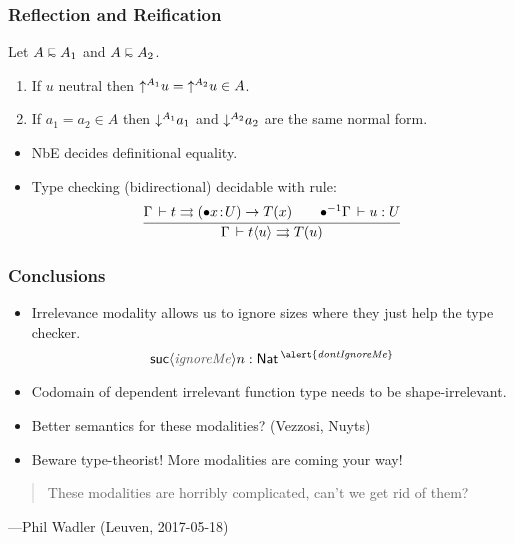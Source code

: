 \documentclass[t]{beamer}
\newcommand{\cAnn}{\color{red!80!black}}%
\renewcommand{\emph}[1]{{\cAnn#1}}
\newcommand{\irr}{\mathord{\bullet}}
\renewcommand{\erhyp}[3][\irr]{#1#2 \of #3}
\renewcommand{\erfunT}[4][\irr]{(\erhyp[#1]{#2}{#3}) \to #4}
\renewcommand{\resurrect}[1]{\irr^{-1}#1}
\begin{document}
\begin{frame}%
  \frametitle{Reflection and Reification}
  \begin{theorem}
    Let $A \shape A_1$ and $A \shape A_2$.
    \begin{enumerate}
    \item If $u$ neutral then $\mathord{\uparrow^{A_1}} u = \mathord{\uparrow^{A_2}} u \in A$.
    \item If $a_1 = a_2 \in A$ then $\mathord{\downarrow^{A_1}} a_1$ and $\mathord{\downarrow^{A_2}} a_2$ are the same normal form.
    \end{enumerate}
  \end{theorem}
  \begin{itemize}
  \item NbE decides definitional equality.
  \item Type checking (bidirectional) decidable with rule:
\[
  \ru{\Gamma \der t \jinf \erfunT x U T(x) \qquad
      \resurrect \Gamma \der u : U
    }{\Gamma \der t \ann u \jinf T(u)}
\]
  \end{itemize}
\end{frame}


\begin{frame}%
  \frametitle{Conclusions}
  \begin{itemize}
  \item Irrelevance modality allows us to ignore sizes where they just help the type checker.
\[
  \suc {{\color{grey}\mathit{ignoreMe}}} n : \Nat^{\alert{\mathit{dontIgnoreMe}}}
\]
\vspace{-2ex}
  \item Codomain of dependent irrelevant function type needs to be \emph{shape-irrelevant}.
  \item Better semantics for these modalities? (Vezzosi, Nuyts)
  \item Beware type-theorist! More modalities are coming your way!
  \end{itemize}
\end{frame}


\begin{frame}%
\vfill
\begin{quotation}
  These modalities are horribly complicated, can't we get rid of them?
\end{quotation}
\begin{flushright}
---Phil Wadler (Leuven, 2017-05-18)
\end{flushright}
\vfill
\end{frame}



% 
\end{document}
